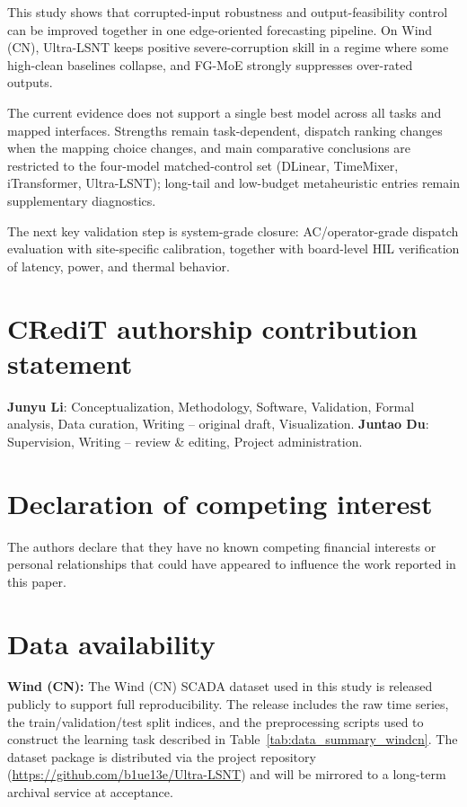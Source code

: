 \documentclass[review,1p,times]{elsarticle}
\begin{document}
This study shows that corrupted-input robustness and output-feasibility control can be improved together in one edge-oriented forecasting pipeline. On Wind (CN), Ultra-LSNT keeps positive severe-corruption skill in a regime where some high-clean baselines collapse, and FG-MoE strongly suppresses over-rated outputs.

The current evidence does not support a single best model across all tasks and mapped interfaces. Strengths remain task-dependent, dispatch ranking changes when the mapping choice changes, and main comparative conclusions are restricted to the four-model matched-control set (DLinear, TimeMixer, iTransformer, Ultra-LSNT); long-tail and low-budget metaheuristic entries remain supplementary diagnostics.

The next key validation step is system-grade closure: AC/operator-grade dispatch evaluation with site-specific calibration, together with board-level HIL verification of latency, power, and thermal behavior.

\section*{CRediT authorship contribution statement}
\textbf{Junyu Li}: Conceptualization, Methodology, Software, Validation, Formal analysis, Data curation, Writing -- original draft, Visualization.
\textbf{Juntao Du}: Supervision, Writing -- review \& editing, Project administration.

\section*{Declaration of competing interest}
The authors declare that they have no known competing financial interests or personal relationships that could have appeared to influence the work reported in this paper.

\section*{Data availability}
\textbf{Wind (CN):} The Wind (CN) SCADA dataset used in this study is released publicly to support full reproducibility. The release includes the raw time series, the train/validation/test split indices, and the preprocessing scripts used to construct the learning task described in Table~\ref{tab:data_summary_windcn}. The dataset package is distributed via the project repository (\url{https://github.com/b1ue13e/Ultra-LSNT}) and will be mirrored to a long-term archival service at acceptance.
\end{document}
